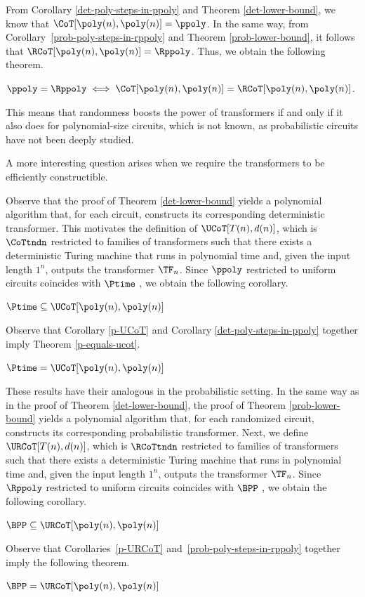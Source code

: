 From Corollary \ref{det-poly-steps-in-ppoly} and Theorem \ref{det-lower-bound}, we know that $\CoT[\poly(n), \poly(n)] = \ppoly$.
In the same way, from Corollary~\ref{prob-poly-steps-in-rppoly} and Theorem \ref{prob-lower-bound}, it follows that $\RCoT[\poly(n), \poly(n)] = \Rppoly$.
Thus, we obtain the following theorem.
%
\begin{theorem}\label{ppoly-rppoly-iff-cot-rcot}
    $\ppoly = \Rppoly \iff \CoT[\poly(n), \poly(n)] = \RCoT[\poly(n), \poly(n)]$.
\end{theorem}
%
This means that randomness boosts the power of transformers if and only if it also does for polynomial-size circuits, which is not known, as probabilistic circuits have not been deeply studied.

\bigskip

A more interesting question arises when we require the transformers to be efficiently constructible.

Observe that the proof of Theorem \ref{det-lower-bound} yields a polynomial algorithm that, for each circuit, constructs its corresponding deterministic transformer.
This motivates the definition of $\UCoT[T(n), d(n)]$, which is $\CoTtndn$ restricted to families of transformers such that there exists a deterministic Turing machine that runs in polynomial time and, given the input length $1^{n}$, outputs the transformer $\TF_n$.
Since $\ppoly$ restricted to uniform circuits coincides with $\Ptime$ , we obtain the following corollary.
%
\begin{corollary}\label{p-UCoT}
    $\Ptime \subseteq \UCoT[\poly(n), \poly(n)]$
\end{corollary}
%
Observe that Corollary \ref{p-UCoT} and Corollary \ref{det-poly-steps-in-ppoly} together imply Theorem \ref{p-equals-ucot}.
%
\begin{theorem}\label{p-equals-ucot}
    $\Ptime = \UCoT[\poly(n), \poly(n)]$
\end{theorem}


\medskip


These results have their analogous in the probabilistic setting.
In the same way as in the proof of Theorem \ref{det-lower-bound}, the proof of Theorem \ref{prob-lower-bound} yields a polynomial algorithm that, for each randomized circuit, constructs its corresponding probabilistic transformer.
Next, we define $\URCoT[T(n), d(n)]$, which is $\RCoTtndn$ restricted to families of transformers such that there exists a deterministic Turing machine that runs in polynomial time and, given the input length $1^{n}$, outputs the transformer $\TF_n$.
Since $\Rppoly$ restricted to uniform circuits coincides with $\BPP$ , we obtain the following corollary.
%
\begin{corollary}\label{p-URCoT}
    $\BPP \subseteq \URCoT[\poly(n), \poly(n)]$
\end{corollary}
%
Observe that Corollaries~\ref{p-URCoT} and~\ref{prob-poly-steps-in-rppoly} together imply the following theorem.
%
\begin{theorem}\label{bpp-equals-urcot}
    $\BPP = \URCoT[\poly(n), \poly(n)]$
\end{theorem}

